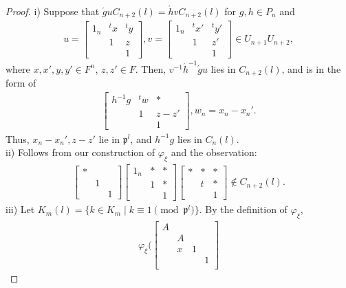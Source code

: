 \documentclass[11pt]{amsart}
\newcommand\vp{\varphi}%
\newcommand\p{{\mathfrak{p}}}
\newcommand\1{\mathbf{1}}
\newcommand\ac{\acute}
\numberwithin{equation}{section}
\begin{document}
\begin{proof}
i) Suppose that $\ac{g} u C_{n+2}(l) = \ac{h} v C_{n+2}(l)$ for $g,h \in P_{n}$ and  
\begin{align*}
u = \begin{bmatrix}
1_n & {}^tx & {}^t y  \\
& 1& z \\
& &1 
\end{bmatrix}, 
v = \begin{bmatrix}
1_n & {}^t x' & {}^t y'  \\
& 1& z' \\
& &1 
\end{bmatrix} \in U_{n+1} U_{n+2},
\end{align*}
where $x,x',y,y' \in F^n$, $z,z' \in F$.
Then, $v^{-1} \ac{h}^{-1}\ac{g} u$ lies in $C_{n+2}(l)$, and is in the form of 
\begin{align*}
\begin{bmatrix}
h^{-1}g & {}^tw &* \\
& 1& z-z'  \\
& &1 
\end{bmatrix}, w_n = x_n -x_n'.
\end{align*} 
Thus, $x_n -x_n', z-z'$ lie in $\p^l$, and $h^{-1}g$ lies in $C_{n}(l)$. \\
ii) Follows from our construction of $\vp_\xi$ and the observation:
\begin{align*}
\begin{bmatrix}
* & &  \\
& 1&  \\
& & 1
\end{bmatrix} 
\begin{bmatrix}
1_n & * &*  \\
&1 & * \\
& & 1
\end{bmatrix} \begin{bmatrix}
* & * &*  \\
&t & * \\
& & 1
\end{bmatrix} \not\in C_{n+2}(l).
\end{align*} 
iii) Let $K_m(l) = \{k \in K_m \mid k \equiv 1 \pmod{\p^l} \}$.
By the definition of $\vp_\xi$, 
\begin{align*}
\vp_\xi(\begin{bmatrix}
A & & &  \\
&A &  & \\
& x & 1 &  \\
& & &1  \\

\end{bmatrix}
\end{align*}
\end{proof}
\end{document}
